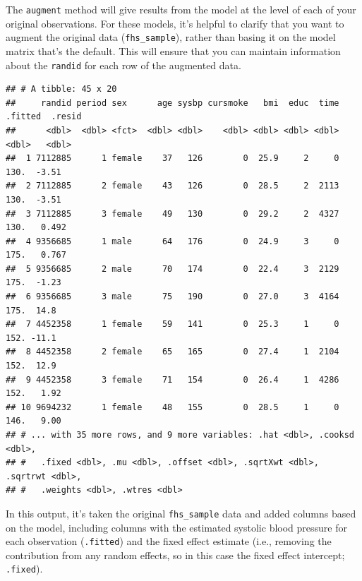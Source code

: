 \documentclass[
]{book}
\newenvironment{Shaded}{\begin{snugshade}}{\end{snugshade}}
\newcommand{\DataTypeTok}[1]{\textcolor[rgb]{0.13,0.29,0.53}{#1}}
\newcommand{\KeywordTok}[1]{\textcolor[rgb]{0.13,0.29,0.53}{\textbf{#1}}}
\newcommand{\NormalTok}[1]{#1}
\newcommand{\OperatorTok}[1]{\textcolor[rgb]{0.81,0.36,0.00}{\textbf{#1}}}
\newcommand{\StringTok}[1]{\textcolor[rgb]{0.31,0.60,0.02}{#1}}
\begin{document}
The \texttt{augment} method will give results from the model at the level of each of your
original observations. For these models, it's helpful to clarify that you want
to augment the original data (\texttt{fhs\_sample}), rather than basing it on the model
matrix that's the default. This will ensure that you can maintain information about
the \texttt{randid} for each row of the augmented data.

\begin{Shaded}
\end{Shaded}

\begin{verbatim}
## # A tibble: 45 x 20
##     randid period sex      age sysbp cursmoke   bmi  educ  time .fitted  .resid
##      <dbl>  <dbl> <fct>  <dbl> <dbl>    <dbl> <dbl> <dbl> <dbl>   <dbl>   <dbl>
##  1 7112885      1 female    37   126        0  25.9     2     0    130.  -3.51 
##  2 7112885      2 female    43   126        0  28.5     2  2113    130.  -3.51 
##  3 7112885      3 female    49   130        0  29.2     2  4327    130.   0.492
##  4 9356685      1 male      64   176        0  24.9     3     0    175.   0.767
##  5 9356685      2 male      70   174        0  22.4     3  2129    175.  -1.23 
##  6 9356685      3 male      75   190        0  27.0     3  4164    175.  14.8  
##  7 4452358      1 female    59   141        0  25.3     1     0    152. -11.1  
##  8 4452358      2 female    65   165        0  27.4     1  2104    152.  12.9  
##  9 4452358      3 female    71   154        0  26.4     1  4286    152.   1.92 
## 10 9694232      1 female    48   155        0  28.5     1     0    146.   9.00 
## # ... with 35 more rows, and 9 more variables: .hat <dbl>, .cooksd <dbl>,
## #   .fixed <dbl>, .mu <dbl>, .offset <dbl>, .sqrtXwt <dbl>, .sqrtrwt <dbl>,
## #   .weights <dbl>, .wtres <dbl>
\end{verbatim}

In this output, it's taken the original \texttt{fhs\_sample} data and added columns
based on the model, including columns with the estimated systolic blood pressure
for each observation (\texttt{.fitted}) and the fixed effect estimate (i.e., removing
the contribution from any random effects, so in this case the fixed effect
intercept; \texttt{.fixed}).
\end{document}
